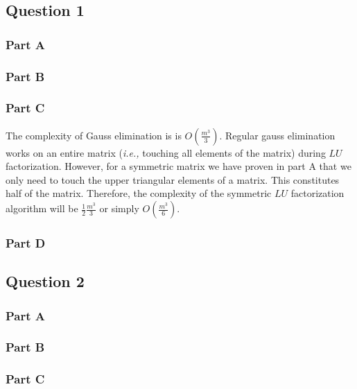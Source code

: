 \subsection{Question 1}
\subsubsection{Part A}

\newpage
\subsubsection{Part B}



\subsubsection{Part C}
The complexity of Gauss elimination is is \(O(\frac{m^{3}}{3})\).
Regular gauss elimination works on an entire matrix ({\em i.e.,} touching all elements of the matrix) during \(LU\) factorization.
However, for a symmetric matrix we have proven in part A that we only need to touch the upper triangular elements of a matrix.
This constitutes half of the matrix.
Therefore, the complexity of the symmetric \(LU\) factorization algorithm will be \(\frac{1}{2}\frac{m^{3}}{3}\) or simply \(O(\frac{m^{3}}{6})\).

\newpage
\subsubsection{Part D}

\newpage
\subsection{Question 2}
\subsubsection{Part A}

\newpage
\subsubsection{Part B}

\newpage
\subsubsection{Part C}

